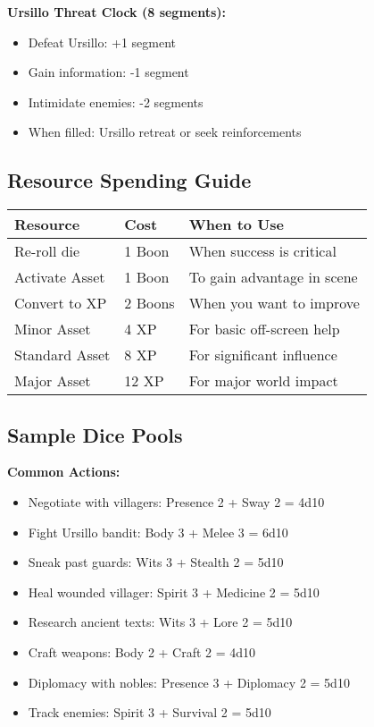 \documentclass[11pt]{article}
\newcommand{\checkmark}{\ding{51}}
\begin{document}
\textbf{Ursillo Threat Clock (8 segments):}
\begin{itemize}
\item \checkmark Defeat Ursillo: +1 segment
\item \checkmark Gain information: -1 segment
\item \checkmark Intimidate enemies: -2 segments
\item When filled: Ursillo retreat or seek reinforcements
\end{itemize}

\subsection{Resource Spending Guide}

\begin{center}
\begin{tabular}{|l|l|l|}
\hline
\textbf{Resource} & \textbf{Cost} & \textbf{When to Use} \\
\hline
Re-roll die & 1 Boon & When success is critical \\
Activate Asset & 1 Boon & To gain advantage in scene \\
Convert to XP & 2 Boons & When you want to improve \\
Minor Asset & 4 XP & For basic off-screen help \\
Standard Asset & 8 XP & For significant influence \\
Major Asset & 12 XP & For major world impact \\
\hline
\end{tabular}
\end{center}

\subsection{Sample Dice Pools}

\textbf{Common Actions:}
\begin{itemize}
\item Negotiate with villagers: Presence 2 + Sway 2 = 4d10
\item Fight Ursillo bandit: Body 3 + Melee 3 = 6d10
\item Sneak past guards: Wits 3 + Stealth 2 = 5d10
\item Heal wounded villager: Spirit 3 + Medicine 2 = 5d10
\item Research ancient texts: Wits 3 + Lore 2 = 5d10
\item Craft weapons: Body 2 + Craft 2 = 4d10
\item Diplomacy with nobles: Presence 3 + Diplomacy 2 = 5d10
\item Track enemies: Spirit 3 + Survival 2 = 5d10
\end{itemize}
\end{document}
